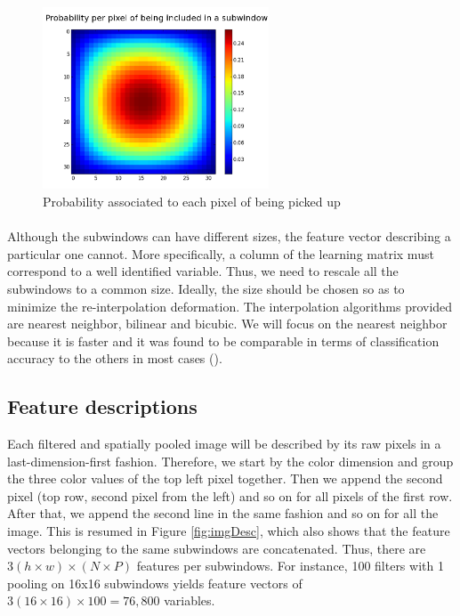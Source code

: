 \documentclass[a4paper]{report}
\begin{document}
	\begin{figure}
		\centering
			\includegraphics[width=0.6\textwidth]{images/probpixel.png}
		\caption{\label{fig:probpixel}Probability associated to each pixel of being picked up}
	\end{figure}
		
		\paragraph{}
		Although the subwindows can have different sizes, the feature vector describing a particular one cannot. More specifically, a column of the learning matrix must correspond to a well identified variable. Thus, we need to rescale all the subwindows to a common size. Ideally, the size should be chosen so as to minimize the re-interpolation deformation. The interpolation algorithms provided are nearest neighbor, bilinear and bicubic. We will focus on the nearest neighbor because it is faster and it was found to be comparable in terms of classification accuracy to the others in most cases (\cite{base}).
		
		\subsection{Feature descriptions}		
		Each filtered and spatially pooled image will be described by its raw pixels in a last-dimension-first fashion. Therefore, we start by the color dimension and group the three color values of the top left pixel together. Then we append the second pixel (top row, second pixel from the left) and so on for all pixels of the first row. After that, we append the second line in the same fashion and so on for all the image. This is resumed in Figure \ref{fig:imgDesc}, which also shows that the feature vectors belonging to the same subwindows are concatenated.
		Thus, there are $3(h \times w) \times (N \times P)$ features per subwindows. For instance, 100 filters with 1 pooling on 16x16 subwindows yields feature vectors of $3(16 \times 16) \times 100 = 76,800$ variables.
		
\end{document}
